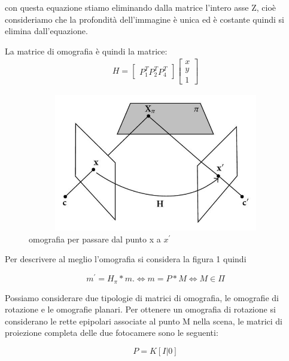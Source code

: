 \documentclass[11pt, oneside]{article}   	%
\begin{document}
con questa equazione stiamo eliminando dalla matrice l'intero asse Z, cioè consideriamo che la profondità dell'immagine è unica ed è costante quindi si elimina dall'equazione.

La matrice di omografia è quindi la matrice:\\
\begin{align}
H =
	\begin{bmatrix}
		P_1^T  P_2^T P_4^T
	\end{bmatrix}
	\begin{bmatrix}
		x  \\
		y  \\
		1
	\end{bmatrix}
\end{align}







\begin{figure}
	\includegraphics[width=15cm, height=6cm]{rette_epipolari}
	\caption{omografia per passare dal punto x a $x^{'}$}
\end{figure}





Per descrivere al meglio l'omografia si considera la figura 1 quindi

\begin{displaymath} 
	m^{'} = H_{\pi}* m. \iff m = P * M \iff M \in \Pi
\end{displaymath}


Possiamo considerare due tipologie di matrici di omografia, le omografie di rotazione e le omografie planari.
Per ottenere un omografia di rotazione si considerano le rette epipolari associate al punto M nella scena,
le matrici di proiezione completa delle due fotocamere sono le seguenti:

\begin{displaymath} 
	P = K[I|0]
\end{displaymath}
\end{document}
